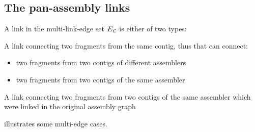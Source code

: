 \subsection{The pan-assembly links}

A link in the multi-link-edge set \(E_{\mathcal{L}}{}\) is either of two types:
\begin{description}[style=nextline]
  \item[Pangenome link] A link connecting two fragments from the same contig, thus that can connect:
    \begin{itemize}
      \item two fragments from two contigs of different assemblers
      \item two fragments from two contigs of the same assembler
    \end{itemize}
  \item[Assembly link] A link connecting two fragments from two contigs of the same assembler which were linked in the original assembly graph
\end{description}

 illustrates some multi-edge cases.
